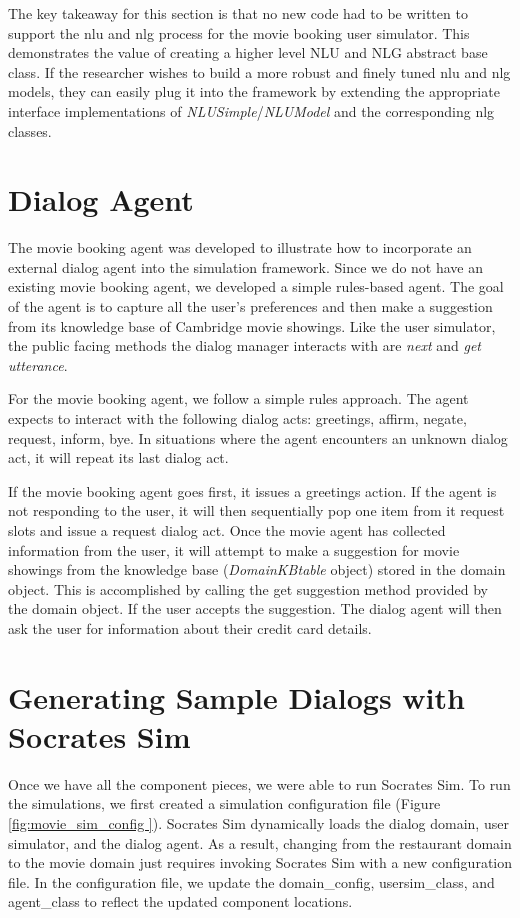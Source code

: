 The key takeaway for this section is that no new code had to be written to support the nlu and nlg process for the movie booking user simulator. This demonstrates the value of creating a higher level NLU and NLG abstract base class. If the researcher wishes to build a more robust and finely tuned nlu and nlg models, they can easily plug it into the framework by extending the appropriate interface implementations of \textit{NLUSimple}/\textit{NLUModel} and the corresponding nlg classes. 

\section{Dialog Agent}

The movie booking agent was developed to illustrate how to incorporate an external dialog agent into the simulation framework. Since we do not have an existing movie booking agent, we developed a simple rules-based agent. The goal of the agent is to capture all the user's preferences and then make a suggestion from its knowledge base of Cambridge movie showings. Like the user simulator, the public facing methods the dialog manager interacts with are \textit{next} and \textit{get utterance}. 

For the movie booking agent, we follow a simple rules approach. The agent expects to interact with the following dialog acts: greetings, affirm, negate, request, inform, bye. In situations where the agent encounters an unknown dialog act, it will repeat its last dialog act. 

If the movie booking agent goes first, it issues a greetings action. If the agent is not responding to the user, it will then sequentially pop one item from it request slots and issue a request dialog act. Once the movie agent has collected information from the user, it will attempt to make a suggestion for movie showings from the knowledge base (\textit{DomainKBtable} object)  stored in the domain object. This is accomplished by calling the get suggestion method provided by the domain object. If the user accepts the suggestion. The dialog agent will then ask the user for information about their credit card details.

\section{Generating Sample Dialogs with Socrates Sim}

Once we have all the component pieces, we were able to run Socrates Sim. To run the simulations, we first created a simulation configuration file (Figure \ref{fig:movie_sim_config }). Socrates Sim dynamically loads the dialog domain, user simulator, and the dialog agent. As a result, changing from the restaurant domain to the movie domain just requires invoking Socrates Sim with a new configuration file. In the configuration file, we update the domain\_config, usersim\_class, and agent\_class to reflect the updated component locations. 


